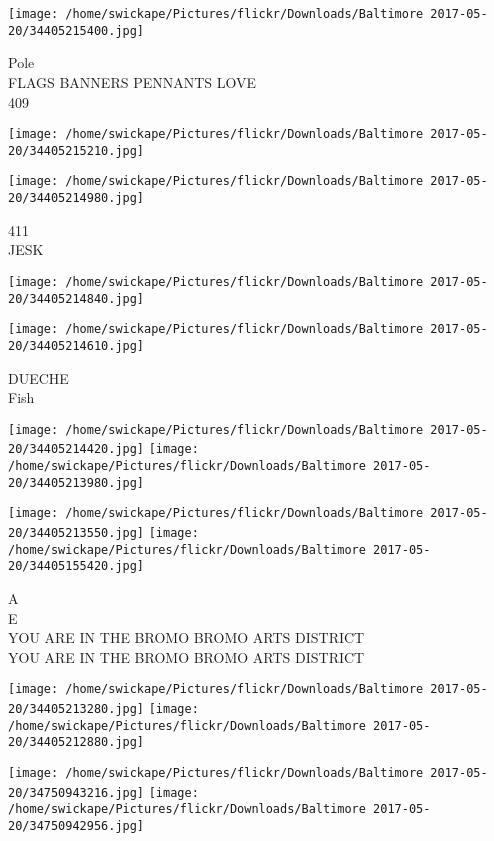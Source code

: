 \documentclass[10pt,letterpaper]{article}
\begin{document}
\vspace{0.25in}
\texttt{[image: /home/swickape/Pictures/flickr/Downloads/Baltimore 2017-05-20/34405215400.jpg]}

Pole\\
FLAGS BANNERS PENNANTS LOVE\\
409
\pagebreak

\texttt{[image: /home/swickape/Pictures/flickr/Downloads/Baltimore 2017-05-20/34405215210.jpg]}

\vspace{0.25in}
\texttt{[image: /home/swickape/Pictures/flickr/Downloads/Baltimore 2017-05-20/34405214980.jpg]}

411\\
JESK
\pagebreak

\texttt{[image: /home/swickape/Pictures/flickr/Downloads/Baltimore 2017-05-20/34405214840.jpg]}

\vspace{0.25in}
\texttt{[image: /home/swickape/Pictures/flickr/Downloads/Baltimore 2017-05-20/34405214610.jpg]}

DUECHE\\
Fish
\pagebreak

\texttt{[image: /home/swickape/Pictures/flickr/Downloads/Baltimore 2017-05-20/34405214420.jpg]}
\texttt{[image: /home/swickape/Pictures/flickr/Downloads/Baltimore 2017-05-20/34405213980.jpg]}

\texttt{[image: /home/swickape/Pictures/flickr/Downloads/Baltimore 2017-05-20/34405213550.jpg]}
\texttt{[image: /home/swickape/Pictures/flickr/Downloads/Baltimore 2017-05-20/34405155420.jpg]}

A\\
E\\
YOU ARE IN THE BROMO BROMO ARTS DISTRICT\\
YOU ARE IN THE BROMO BROMO ARTS DISTRICT
\pagebreak

\texttt{[image: /home/swickape/Pictures/flickr/Downloads/Baltimore 2017-05-20/34405213280.jpg]}
\texttt{[image: /home/swickape/Pictures/flickr/Downloads/Baltimore 2017-05-20/34405212880.jpg]}

\texttt{[image: /home/swickape/Pictures/flickr/Downloads/Baltimore 2017-05-20/34750943216.jpg]}
\texttt{[image: /home/swickape/Pictures/flickr/Downloads/Baltimore 2017-05-20/34750942956.jpg]}
\end{document}
